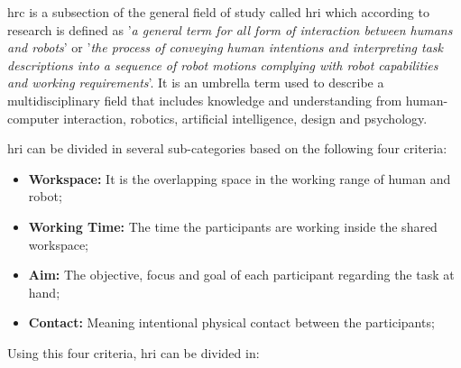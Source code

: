 
\par \ac{hrc} is a subsection of the general field of study called \ac{hri} which according to research \cite{hri.1, hri.2} is defined as '\textit{a general term for all form of interaction between humans and robots}' or '\textit{the process of conveying human intentions and interpreting task descriptions into a sequence of robot motions complying with robot capabilities and working requirements}'. It is an umbrella term used to describe a multidisciplinary field that includes knowledge and understanding from human-computer interaction, robotics, artificial intelligence, design and psychology. 

\noindent \ac{hri} can be divided in several sub-categories based on the following four criteria:

\begin{itemize}
    \item \textbf{Workspace: }It is the overlapping space in the working range of human and robot;
    \item \textbf{Working Time: }The time the participants are working inside the shared workspace;
    \item \textbf{Aim: }The objective, focus and goal of each participant regarding the task at hand;
    \item \textbf{Contact: }Meaning intentional physical contact between the participants;
\end{itemize}

\noindent Using this four criteria, \ac{hri} can be divided in:

